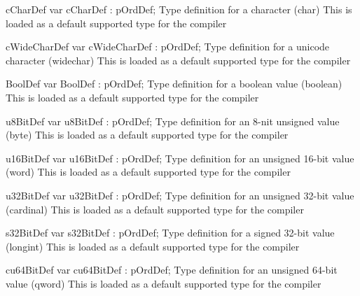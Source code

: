 \documentclass [12pt]{article}
\begin{document}
\begin{variable}{cCharDef}
\Declaration
var cCharDef : pOrdDef;
\Description
Type definition for a character (\textsf{char}) 
\Notes
This is loaded as a default supported type for the compiler 
\end{variable}

\begin{variable}{cWideCharDef}
\Declaration
var cWideCharDef : pOrdDef;
\Description
Type definition for a unicode character (\textsf{widechar}) 
\Notes 
This is loaded as a default supported type for the compiler 
\end{variable}

\begin{variable}{BoolDef}
\Declaration
var BoolDef : pOrdDef;
\Description
Type definition for a boolean value (\textsf{boolean})
\Notes
This is loaded as a default supported type for the compiler
\end{variable}

\begin{variable}{u8BitDef}
\Declaration
var u8BitDef : pOrdDef;
\Description
Type definition for an 8-nit unsigned value (\textsf{byte})
\Notes
This is loaded as a default supported type for the compiler
\end{variable}

\begin{variable}{u16BitDef}
\Declaration
var u16BitDef : pOrdDef;
\Description
Type definition for an unsigned 16-bit value (\textsf{word})
\Notes
This is loaded as a default supported type for the compiler
\end{variable}

\begin{variable}{u32BitDef}
\Declaration
var u32BitDef : pOrdDef;
\Description
Type definition for an unsigned 32-bit value (\textsf{cardinal})
\Notes
This is loaded as a default supported type for the compiler
\end{variable}

\begin{variable}{s32BitDef}
\Declaration
var s32BitDef : pOrdDef;
\Description
Type definition for a signed 32-bit value (\textsf{longint})
\Notes
This is loaded as a default supported type for the compiler
\end{variable}

\begin{variable}{cu64BitDef}
\Declaration
var cu64BitDef : pOrdDef;
\Description
Type definition for an unsigned 64-bit value (\textsf{qword})
\Notes
This is loaded as a default supported type for the compiler
\end{variable}
\end{document}
